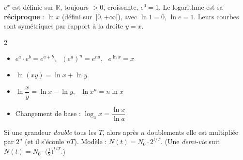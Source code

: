 \documentclass[11pt,a4paper]{article}
\newcommand{\R}{\mathbb{R}}\newcommand{\Z}{\mathbb{Z}}\newcommand{\N}{\mathbb{N}}
\begin{document}
$e^x$ est définie sur $\R$, toujours $>0$, croissante, $e^0=1$. Le logarithme est sa \textbf{réciproque} : $\ln x$ (défini sur $\,]0,+\infty[$), avec $\ln 1=0$, $\ln e=1$. Leurs courbes sont symétriques par rapport à la droite $y=x$.

\begin{tcolorbox}[boxbase,colframe=thmcol,colback=thmcol!6,title={\textsc{Propriétés indispensables}}]
\begin{multicols}{2}\small
\begin{itemize}[leftmargin=1.2em,topsep=0pt,itemsep=2pt]
  \item $e^a\cdot e^b=e^{a+b}$, \ $(e^a)^n=e^{na}$, \ $e^{\ln x}=x$
  \item $\ln(xy)=\ln x+\ln y$
  \item $\ln\dfrac{x}{y}=\ln x-\ln y$, \ $\ln x^n=n\ln x$
  \item Changement de base : $\log_a x=\dfrac{\ln x}{\ln a}$
\end{itemize}
\end{multicols}
\end{tcolorbox}

\begin{idee}
Si une grandeur \emph{double} tous les $T$, alors après $n$ doublements elle est multipliée par $2^n$ (et il s'écoule $nT$). Modèle : $N(t)=N_0\cdot 2^{t/T}$. (Une \emph{demi-vie} suit $N(t)=N_0\cdot\big(\tfrac12\big)^{t/T}$.)
\end{idee}

\begin{center}
\end{center}
\end{document}
